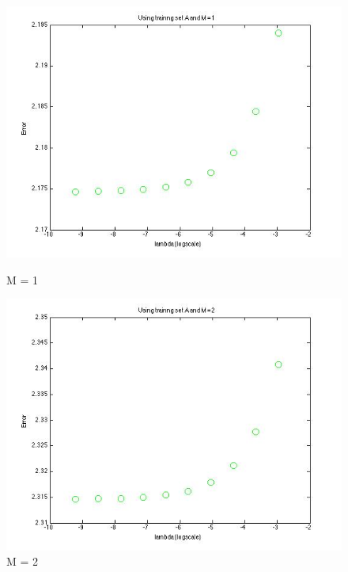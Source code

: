 \begin{figure}[!htb]
  \includegraphics[width=\linewidth]{figures/p4_LASSO_regressA_m=1}
  \caption{M = 1}
\endminipage\hfill
{}
  \includegraphics[width=\linewidth]{figures/p4_LASSO_regressA_m=2}
  \caption{M = 2}
\endminipage\hfill
\end{figure}


